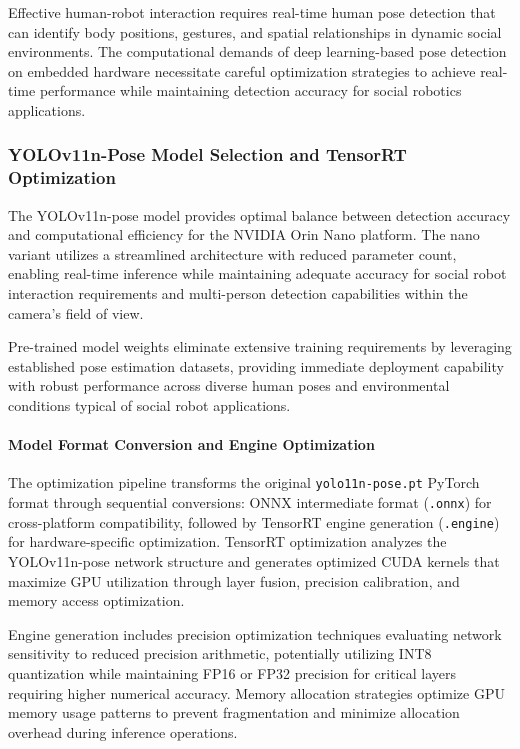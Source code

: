 Effective human-robot interaction requires real-time human pose detection that can identify body positions, gestures, and spatial relationships in dynamic social environments. The computational demands of deep learning-based pose detection on embedded hardware necessitate careful optimization strategies to achieve real-time performance while maintaining detection accuracy for social robotics applications.

\subsubsection{YOLOv11n-Pose Model Selection and TensorRT Optimization}

The YOLOv11n-pose model provides optimal balance between detection accuracy and computational efficiency for the NVIDIA Orin Nano platform. The nano variant utilizes a streamlined architecture with reduced parameter count, enabling real-time inference while maintaining adequate accuracy for social robot interaction requirements and multi-person detection capabilities within the camera's field of view.

Pre-trained model weights eliminate extensive training requirements by leveraging established pose estimation datasets, providing immediate deployment capability with robust performance across diverse human poses and environmental conditions typical of social robot applications.

\paragraph{Model Format Conversion and Engine Optimization}

The optimization pipeline transforms the original \texttt{yolo11n-pose.pt} PyTorch format through sequential conversions: ONNX intermediate format (\texttt{.onnx}) for cross-platform compatibility, followed by TensorRT engine generation (\texttt{.engine}) for hardware-specific optimization. TensorRT optimization analyzes the YOLOv11n-pose network structure and generates optimized CUDA kernels that maximize GPU utilization through layer fusion, precision calibration, and memory access optimization.

Engine generation includes precision optimization techniques evaluating network sensitivity to reduced precision arithmetic, potentially utilizing INT8 quantization while maintaining FP16 or FP32 precision for critical layers requiring higher numerical accuracy. Memory allocation strategies optimize GPU memory usage patterns to prevent fragmentation and minimize allocation overhead during inference operations.

